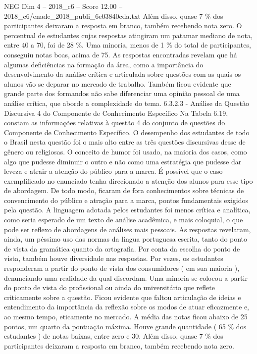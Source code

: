 \begin{textsample}{NEG Dim 4 – 2018\_c6 – Score 12.00 – 2018\_c6/enade\_2018\_publi\_6e03840cda.txt}
Além disso, quase 7 \% dos participantes deixaram a resposta em branco, também recebendo nota zero.
O percentual de estudantes cujas respostas atingiram um patamar mediano de nota, entre 40 a 70, foi de 28 \%.
Uma minoria, menos de 1 \% do total de participantes, conseguiu notas boas, acima de 75.
As respostas encontradas revelam que há algumas deficiências na formação da área, como a importância do desenvolvimento da análise crítica e articulada sobre questões com as quais os alunos vão se deparar no mercado de trabalho.
Também ficou evidente que grande parte dos formandos não sabe diferenciar uma opinião pessoal de uma análise crítica, que aborde a complexidade do tema. 6.3.2.3 - Análise da Questão Discursiva 4 do Componente de Conhecimento Específico Na Tabela 6.19, constam as informações relativas à questão 4 do conjunto de questões do Componente de Conhecimento Específico.
O desempenho dos estudantes de todo o Brasil nesta questão foi o mais alto entre as três questões discursivas desse de gênero ou religiosas.
O conceito de humor foi usado, na maioria dos casos, como algo que pudesse diminuir o outro e não como uma estratégia que pudesse dar leveza e atrair a atenção do público para a marca.
É possível que o caso exemplificado no enunciado tenha direcionado a atenção dos alunos para esse tipo de abordagem.
De todo modo, ficaram de fora conhecimentos sobre técnicas de convencimento do público e atração para a marca, pontos fundamentais exigidos pela questão.
A linguagem adotada pelos estudantes foi menos crítica e analítica, como seria esperado de um texto de análise acadêmica, e mais coloquial, o que pode ser reflexo de abordagens de análises mais pessoais.
As respostas revelaram, ainda, um péssimo uso das normas da língua portuguesa escrita, tanto do ponto de vista da gramática quanto da ortografia.
Por conta da escolha do ponto de vista, também houve diversidade nas respostas.
Por vezes, os estudantes responderam a partir do ponto de vista dos consumidores ( em sua maioria ), denunciando uma realidade da qual discordam.
Uma minoria se colocou a partir do ponto de vista do profissional ou ainda do universitário que reflete criticamente sobre a questão.
Ficou evidente que faltou articulação de ideias e entendimento da importância da reflexão sobre os modos de atuar eficazmente e, ao mesmo tempo, eticamente no mercado.
A média das notas ficou abaixo de 25 pontos, um quarto da pontuação máxima.
Houve grande quantidade ( 65 \% dos estudantes ) de notas baixas, entre zero e 30.
Além disso, quase 7 \% dos participantes deixaram a resposta em branco, também recebendo nota zero.

\end{textsample}
